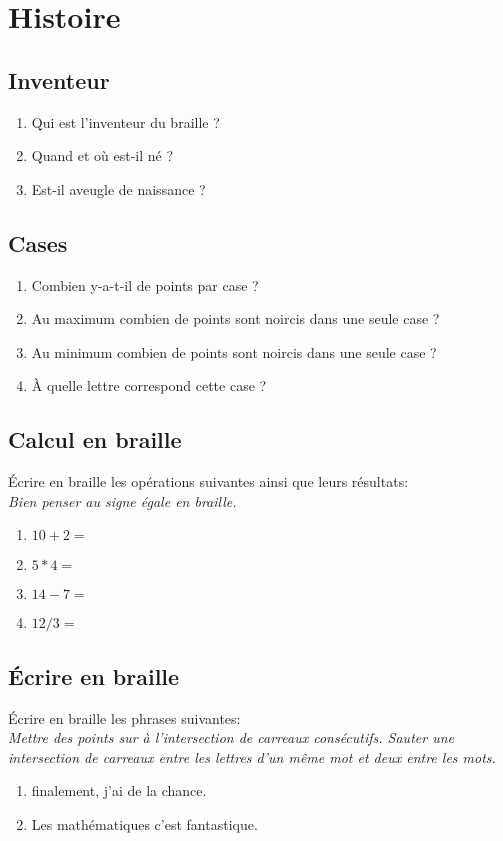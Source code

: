 \documentclass[10pt]{article}
\begin{document}

\section{Histoire}
\subsection{Inventeur}
\begin{enumerate}
\item Qui est l'inventeur du braille ?
\item Quand et où est-il né ?
\item Est-il aveugle de naissance ?
\end{enumerate}
\subsection{Cases}
\begin{enumerate}
\item Combien y-a-t-il de points par case ?
\item Au maximum combien de points sont noircis dans une seule case ?
\item Au minimum combien de points sont noircis dans une seule case ?
\item À quelle lettre correspond cette case ?
\end{enumerate}
\subsection{Calcul en braille}
Écrire en braille les opérations suivantes ainsi que leurs résultats:\\
\textit{Bien penser au signe égale en braille.}
\begin{enumerate}
\item $10 + 2 = $
\item $5 * 4 = $
\item $14 - 7 = $
\item $12 / 3= $
\end{enumerate}
\subsection{Écrire en braille}
Écrire en braille les phrases suivantes:\\
\textit{Mettre des points sur à l'intersection de carreaux consécutifs. Sauter une intersection de carreaux entre les lettres d'un même mot et deux entre les mots.}
\begin{enumerate}
\item finalement, j'ai de la chance.
\item Les mathématiques c'est fantastique.
\end{enumerate}
\end{document}
